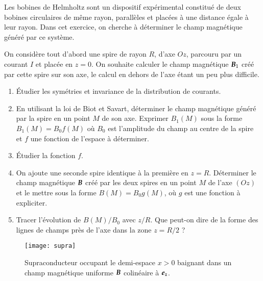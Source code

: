 \begin{exocor}
Les bobines de Helmholtz sont un dispositif expérimental constitué de 
deux bobines circulaires de même rayon, parallèles et placées à une distance
égale à leur rayon. Dans cet exercice, on cherche à déterminer le champ magnétique
généré par ce système.

On considère tout d'abord une spire de rayon $R$, d'axe $Oz$, 
parcouru par un courant $I$ et
placée en $z = 0$.
On souhaite calculer le champ magnétique $\vecb_1$ créé par cette spire sur son axe,
le calcul en dehors de l'axe étant un peu plus difficile.
\begin{enumerate}
	\item Étudier les symétries et invariance de la distribution de courants.
	\item En utilisant la loi de Biot et Savart, déterminer le champ magnétique
	  généré par la spire en un point $M$ de son axe. Exprimer $B_1(M)$
	  sous la forme $B_1(M) = B_0 f(M)$ où $B_0$ est l'amplitude
	  du champ au centre de la spire et $f$ une fonction de l'espace à déterminer.
	\item Étudier la fonction $f$.
	\item On ajoute une seconde spire identique à la première en $z = R$. 
	  Déterminer le champ magnétique $\vecb$ créé par les deux spires en un point $M$ 
	  de l'axe $(Oz)$ et le mettre sous la forme $B(M) = B_0g(M)$, où 
	  $g$ est une fonction à expliciter.
  \item Tracer l'évolution de $B(M)/B_0$ avec $z/R$. 
	   Que peut-on dire de la forme des 
	   lignes de champs près de l'axe dans la zone $z = R/2$ ?
\end{enumerate}
\end{exocor}

\begin{figure}[h]
	\centering
	\texttt{[image: supra]}
	\caption{Supraconducteur occupant le demi-espace $x > 0$ baignant dans
	un champ magnétique uniforme $\vecb$ colinéaire à $\ez$.}%
	\label{fig:supra}
\end{figure}

